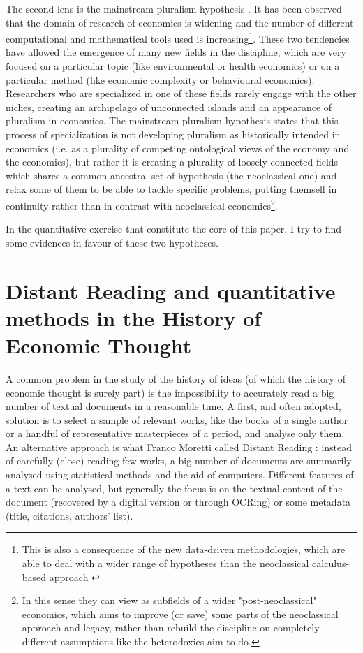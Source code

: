 \documentclass[a4paper, headings=standardclasses]{scrartcl}
\begin{document}
The second lens is the mainstream pluralism hypothesis \parencite{davis2006,davis2019a,davis2019b,cedrini2018}. It has been observed that the domain of research of economics is widening and the number of different computational and mathematical tools used is increasing\footnote{This is also a consequence of the new data-driven methodologies, which are able to deal with a wider range of hypotheses than the neoclassical calculus-based approach \Parencite[see][]{cherrier2022}}. These two tendencies have allowed the emergence of many new fields in the discipline, which are very focused on a particular topic (like environmental or health economics) or on a particular method (like economic complexity or behavioural economics).
Researchers who are specialized in one of these fields rarely engage with the other niches, creating an archipelago of unconnected islands and an appearance of pluralism in economics.
The mainstream pluralism hypothesis states that this process of specialization is not developing pluralism as historically intended in economics (i.e. as a plurality of competing ontological views of the economy and the economics), but rather it is creating a plurality of loosely connected fields which shares a common ancestral set of hypothesis (the neoclassical one) and relax some of them to be able to tackle specific problems, putting themself in continuity rather than in contrast with neoclassical economics\footnote{In this sense they can view as subfields of a wider "post-neoclassical" economics, which aims to improve (or save) some parts of the neoclassical approach and legacy, rather than rebuild the discipline on completely different assumptions like the heterodoxies aim to do.}.

In the quantitative exercise that constitute the core of this paper, I try to find some evidences in favour of these two hypotheses.

\section{Distant Reading and quantitative methods in the History of Economic Thought}
A common problem in the study of the history of ideas (of which the history of economic thought is surely part) is the impossibility to accurately read a big number of textual documents in a reasonable time. A first, and often adopted, solution is to select a sample of relevant works, like the books of a single author or a handful of representative masterpieces of a period, and analyse only them.
An alternative approach is what Franco Moretti called Distant Reading \parencite{moretti2013}: instead of carefully (close) reading few works, a big number of documents are summarily analysed using statistical methods and the aid of computers.
Different features of a text can be analysed, but generally the focus is on the textual content of the document (recovered by a digital version or through OCRing) or some metadata (title, citations, authors' list).
\end{document}
